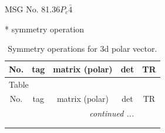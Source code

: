 \documentclass[fleqn,8pt]{jsarticle}
\begin{document}
\setcounter{MaxMatrixCols}{32}

\renewcommand{\tablename}{Table~}
\renewcommand{\figurename}{Figure~}
\begin{center}
\LARGE
MSG No. 81.36\quad$P_{c}\bar{4}$
\end{center}
* symmetry operation
\renewcommand{\arraystretch}{1.3}
\begin{longtable}{ccccc}
\caption{Symmetry operations for 3d polar vector.}
 \\
 \hline \hline
No. & tag & matrix (polar) & det & TR \\ \hline \endfirsthead

\multicolumn{4}{l}{\tablename\ \thetable{}} \\
 \hline \hline
No. & tag & matrix (polar) & det & TR \\ \hline \endhead

 \hline \hline
\multicolumn{4}{r}{\footnotesize\it continued ...} \\ \endfoot

 \hline \hline
\multicolumn{4}{r}{} \\ \endlastfoot


\end{longtable}
\end{document}
